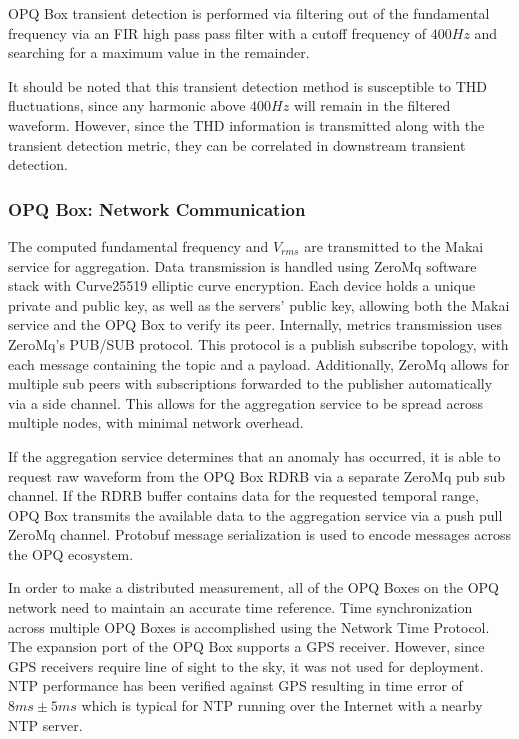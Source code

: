 OPQ Box transient detection is performed via filtering out of the fundamental frequency via an FIR high pass pass filter with a cutoff frequency of $400Hz$ and searching for a maximum value in the remainder.

It should be noted that this transient detection method is susceptible to THD fluctuations, since any harmonic above $400Hz$ will remain in the filtered waveform.
However, since the THD information is transmitted along with the transient detection metric, they can be correlated in downstream transient detection.

\subsubsection{OPQ Box: Network Communication}\label{subsec:network-communication}

The computed fundamental frequency and $V_{rms}$ are transmitted to the Makai service for aggregation.
Data transmission is handled using ZeroMq software stack with Curve25519 elliptic curve encryption.
Each device holds a unique private and public key, as well as the servers' public key, allowing both the Makai service and the OPQ Box to verify its peer.
Internally, metrics transmission uses ZeroMq's PUB/SUB protocol.
This protocol is a publish subscribe topology, with each message containing the topic and a payload.
Additionally, ZeroMq allows for multiple sub peers with subscriptions forwarded to the publisher automatically via a side channel.
This allows for the aggregation service to be spread across multiple nodes, with minimal network overhead.

If the aggregation service determines that an anomaly has occurred, it is able to request raw waveform from the OPQ Box RDRB via a separate ZeroMq pub sub channel.
If the RDRB buffer contains data for the requested temporal range, OPQ Box transmits the available data to the aggregation service via a push pull ZeroMq channel.
Protobuf message serialization is used to encode messages across the OPQ ecosystem.

In order to make a distributed measurement, all of the OPQ Boxes on the OPQ network need to maintain an accurate time reference.
Time synchronization across multiple OPQ Boxes is accomplished using the Network Time Protocol.
The expansion port of the OPQ Box supports a GPS receiver.
However, since GPS receivers require line of sight to the sky, it was not used for deployment.
NTP performance has been verified against GPS resulting in time error of $8ms\pm 5ms$ which is typical for NTP running over the Internet with a nearby NTP server.

